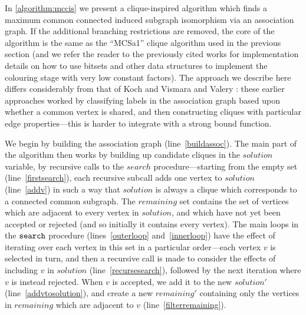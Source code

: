 \documentclass{llncs}
\newcommand{\lineref}[1]{line~\ref{#1}}
\newcommand{\twolinesref}[2]{lines~\ref{#1} and~\ref{#2}}
\begin{document}
In \cref{algorithm:mccis} we present a clique-inspired algorithm which finds a maximum common
connected induced subgraph isomorphism via an association graph. If the additional branching
restrictions are removed, the core of the algorithm is the same as the ``MCSa1'' clique algorithm
used in the previous section (and we refer the reader to the previously cited works for
implementation details on how to use bitsets and other data structures to implement the colouring
stage with very low constant factors). The approach we describe here differs considerably from that
of Koch \cite{DBLP:journals/tcs/Koch01} and Vismara and Valery \cite{DBLP:conf/mco/VismaraV08}:
these earlier approaches worked by classifying labels in the association graph based upon whether a
common vertex is shared, and then constructing cliques with particular edge properties---this is
harder to integrate with a strong bound function.

We begin by building the association graph (\lineref{buildassoc}). The main part of the algorithm
then works by building up candidate cliques in the $\mathit{solution}$ variable, by recursive calls
to the $\mathit{search}$ procedure---starting from the empty set (\lineref{firstsearch}), each
recursive subcall adds one vertex to $\mathit{solution}$ (\lineref{addv}) in such a way that
$\mathit{solution}$ is always a clique which corresponds to a connected common subgraph. The
$\mathit{remaining}$ set contains the set of vertices which are adjacent to every vertex in
$\mathit{solution}$, and which have not yet been accepted or rejected (and so initially it contains
every vertex). The main loops in the $\FuncSty{search}$ procedure
(\twolinesref{outerloop}{innerloop}) have the effect of iterating over each vertex in this set in a
particular order---each vertex $v$ is selected in turn, and then a recursive call is made to
consider the effects of including $v$ in $\mathit{solution}$ (\lineref{recursesearch}), followed by
the next iteration where $v$ is instead rejected. When $v$ is accepted, we add it to the new
$\mathit{solution'}$ (\lineref{addvtosolution}), and create a new $\mathit{remaining'}$ containing
only the vertices in $\mathit{remaining}$ which are adjacent to $v$ (\lineref{filterremaining}).
\end{document}
